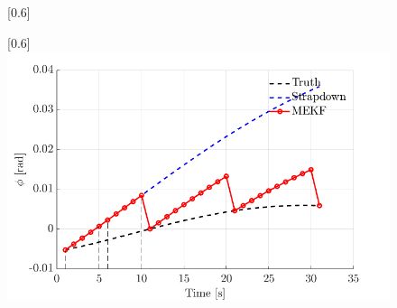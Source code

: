 \documentclass[preview]{standalone}
\begin{document}
	\begin{figure}
		\centering
		\scalebox{0.6}[0.6]{}
	\end{figure}
	\begin{figure}
		\centering
		\scalebox{0.6}[0.6]{\includegraphics{mekf.png}}
	\end{figure}
\end{document}
